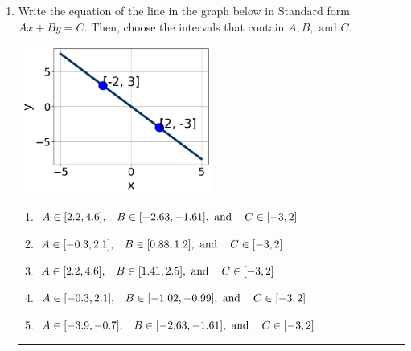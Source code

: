\documentclass[14pt]{extbook}
\newcommand{\litem}[1]{\item#1\hspace*{-1cm}\rule{\textwidth}{0.4pt}}
\begin{document}
\begin{enumerate}
\litem{
Write the equation of the line in the graph below in Standard form $Ax+By=C$. Then, choose the intervals that contain $A, B, \text{ and } C$.
\begin{center}
    \includegraphics[width=0.5\textwidth]{../Figures/linearGraphToStandardC.png}
\end{center}
\begin{enumerate}[label=\Alph*.]
\item \( A \in [2.2, 4.6], \hspace{3mm} B \in [-2.63, -1.61], \text{ and } \hspace{3mm} C \in [-3, 2] \)
\item \( A \in [-0.3, 2.1], \hspace{3mm} B \in [0.88, 1.2], \text{ and } \hspace{3mm} C \in [-3, 2] \)
\item \( A \in [2.2, 4.6], \hspace{3mm} B \in [1.41, 2.5], \text{ and } \hspace{3mm} C \in [-3, 2] \)
\item \( A \in [-0.3, 2.1], \hspace{3mm} B \in [-1.02, -0.99], \text{ and } \hspace{3mm} C \in [-3, 2] \)
\item \( A \in [-3.9, -0.7], \hspace{3mm} B \in [-2.63, -1.61], \text{ and } \hspace{3mm} C \in [-3, 2] \)


\end{enumerate}}
\end{enumerate}
\end{document}
